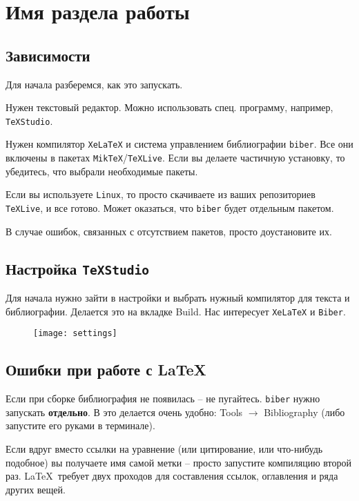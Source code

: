 
\section{Имя раздела работы}

\subsection{Зависимости}
Для начала разберемся, как это запускать. 

Нужен текстовый редактор. Можно использовать спец. программу, например, \texttt{TeXStudio}. 

Нужен компилятор \texttt{XeLaTeX} и система управлением библиографии \texttt{biber}. Все они включены в пакетах \texttt{MikTeX}/\texttt{TeXLive}. Если вы делаете частичную установку, то убедитесь, что выбрали необходимые пакеты. 

Если вы используете \texttt{Linux}, то просто скачиваете из ваших репозиториев \texttt{TeXLive}, и все готово. Может оказаться, что \texttt{biber} будет отдельным пакетом. 

В случае ошибок, связанных с отсутствием пакетов, просто доустановите их.

\subsection{Настройка \texttt{TeXStudio}}

Для начала нужно зайти в настройки и выбрать нужный компилятор для текста и библиографии. Делается это на вкладке Build. Нас интересует \texttt{XeLaTeX} и \texttt{Biber}.
\begin{figure}[H]
    \centering
    \texttt{[image: settings]}
\end{figure}


\subsection{Ошибки при работе с \LaTeX}
Если при сборке библиография не появилась -- не пугайтесь. \texttt{biber} нужно запускать \textbf{отдельно}. В  это делается очень удобно: Tools $\rightarrow$ Bibliography (либо запустите его руками в терминале).

Если вдруг вместо ссылки на уравнение (или цитирование, или что-нибудь подобное) вы получаете имя самой метки -- просто запустите компиляцию второй раз. \LaTeX\, требует двух проходов для составления ссылок, оглавления и ряда других вещей. 


